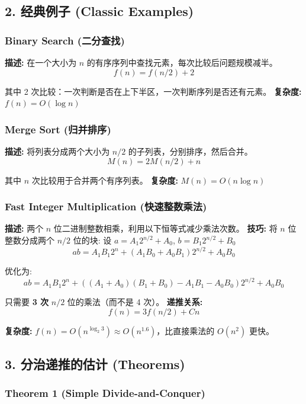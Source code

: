\documentclass[10pt,a4paper,openany]{ctexbook}
\theoremstyle{definition}
\theoremstyle{remark}
\begin{document}
\vspace{-2pt}

\subsection{2. 经典例子 (Classic Examples)}

\subsubsection{Binary Search (二分查找)}

\textbf{描述:} 在一个大小为 $n$ 的有序序列中查找元素，每次比较后问题规模减半。
\[
f(n) = f(n/2) + 2
\]

其中 2 次比较：一次判断是否在上下半区，一次判断序列是否还有元素。
\textbf{复杂度:} $f(n) = O(\log n)$
\subsubsection{Merge Sort (归并排序)}

\textbf{描述:} 将列表分成两个大小为 $n/2$ 的子列表，分别排序，然后合并。
\[
M(n) = 2M(n/2) + n
\]

其中 $n$ 次比较用于合并两个有序列表。
\textbf{复杂度:} $M(n) = O(n \log n)$
\subsubsection{Fast Integer Multiplication (快速整数乘法)}

\textbf{描述:} 两个 $n$ 位二进制整数相乘，利用以下恒等式减少乘法次数。
\textbf{技巧:} 将 $n$ 位整数分成两个 $n/2$ 位的块:
设 $a = A_1 2^{n/2} + A_0$, $b = B_1 2^{n/2} + B_0$
\[
ab = A_1 B_1 2^n + (A_1 B_0 + A_0 B_1) 2^{n/2} + A_0 B_0
\]

优化为:
\[
ab = A_1 B_1 2^n + ((A_1 + A_0)(B_1 + B_0) - A_1 B_1 - A_0 B_0) 2^{n/2} + A_0 B_0
\]

只需要 \textbf{3 次} $n/2$ 位的乘法（而不是 4 次）。
\textbf{递推关系:}
\[
f(n) = 3f(n/2) + Cn
\]

\textbf{复杂度:} $f(n) = O(n^{\log_2 3}) \approx O(n^{1.6})$，比直接乘法的 $O(n^2)$ 更快。
\vspace{-2pt}

\subsection{3. 分治递推的估计 (Theorems)}

\subsubsection{Theorem 1 (Simple Divide-and-Conquer)}
\end{document}
